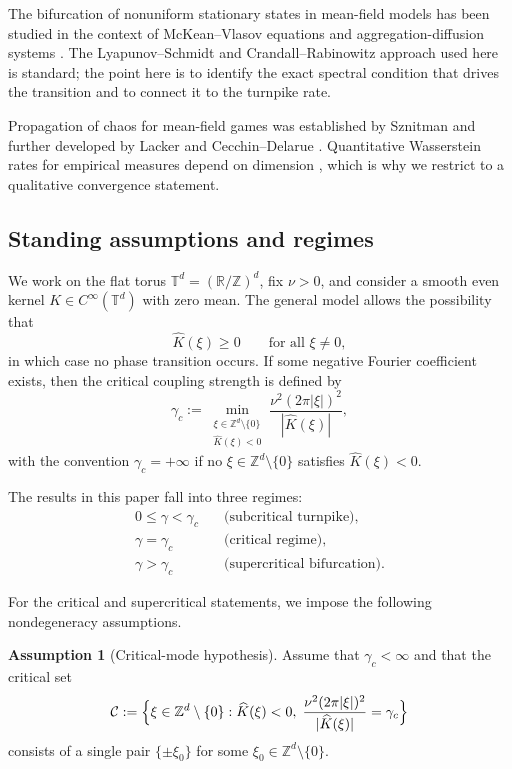 \documentclass[11pt]{amsart}
\theoremstyle{definition}
\newtheorem{assumption}[theorem]{Assumption}
\theoremstyle{remark}
\newcommand{\Td}{\mathbb{T}^d}
\newcommand{\Zd}{\mathbb{Z}^d}
\newcommand{\R}{\mathbb{R}}
\newcommand{\cC}{\mathcal{C}}
\newcommand{\Z}{\mathbb{Z}}
\newcommand{\Kh}{\widehat{K}}
\newcommand{\gamc}{\gamma_c}
\begin{document}
The bifurcation of nonuniform stationary states in mean-field models has been studied in the context of McKean--Vlasov equations \cite{DG87} and aggregation-diffusion systems \cite{CGPS20}. The Lyapunov--Schmidt and Crandall--Rabinowitz approach \cite{CR71,K04} used here is standard; the point here is to identify the exact spectral condition that drives the transition and to connect it to the turnpike rate.

Propagation of chaos for mean-field games was established by Sznitman \cite{S91} and further developed by Lacker \cite{L23} and Cecchin--Delarue \cite{CD22}. Quantitative Wasserstein rates for empirical measures depend on dimension \cite{FG15}, which is why we restrict to a qualitative convergence statement.

\subsection{Standing assumptions and regimes}
\label{sub:assumptions}

We work on the flat torus $\Td=(\R/\Z)^d$, fix $\nu>0$, and consider a smooth even kernel $K\in C^\infty(\Td)$ with zero mean. The general model allows the possibility that
\[
\Kh(\xi)\ge 0 \qquad \text{for all }\xi\neq 0,
\]
in which case no phase transition occurs. If some negative Fourier coefficient exists, then the critical coupling strength is defined by
\begin{equation}
\label{eq:gamc-def}
\gamc :=
\min_{\substack{\xi\in\Zd\setminus\{0\}\\ \Kh(\xi)<0}}
\frac{\nu^2(2\pi|\xi|)^2}{|\Kh(\xi)|},
\end{equation}
with the convention $\gamc=+\infty$ if no $\xi\in\Zd\setminus\{0\}$ satisfies $\Kh(\xi)<0$.

The results in this paper fall into three regimes:
\[
\begin{aligned}
0\le \gamma < \gamc &\quad \text{(subcritical turnpike)},\\
\gamma=\gamc &\quad \text{(critical regime)},\\
\gamma>\gamc &\quad \text{(supercritical bifurcation)}.
\end{aligned}
\]

For the critical and supercritical statements, we impose the following nondegeneracy assumptions.

\begin{assumption}[Critical-mode hypothesis]
\label{ass:critical-mode}
Assume that $\gamc<\infty$ and that the critical set
\[
\cC :=
\Bigl\{\xi\in\Zd\setminus\{0\}:\Kh(\xi)<0,\;
\frac{\nu^2(2\pi|\xi|)^2}{|\Kh(\xi)|}=\gamc\Bigr\}
\]
consists of a single pair $\{\pm \xi_0\}$ for some $\xi_0\in\Zd\setminus\{0\}$.
\end{assumption}
\end{document}
